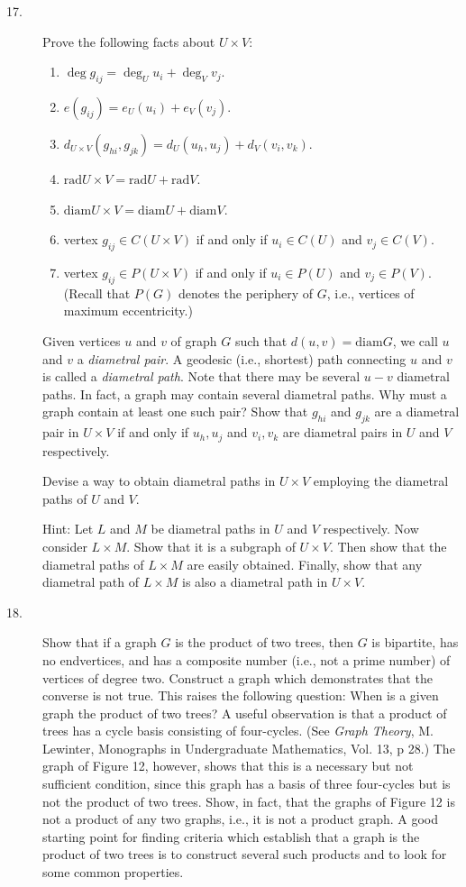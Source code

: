 \documentclass{article}
\begin{document}
\begin{description}
\item[17.] Prove the following facts about $U \times V$:
  \begin{enumerate}[\hspace{1cm}(a)]
    \item $\deg g_{ij} = \deg_U u_i + \deg_V v_j$.
    \item $e(g_{ij}) = e_U(u_i) + e_V(v_j)$.
    \item $d_{U \times V} (g_{hi},g_{jk}) = d_{U} (u_{h},u_{j}) + d_{V} (v_{i},v_{k})$.
    \item $\text{rad} U \times V = \text{rad} U + \text{rad} V$.
    \item $\text{diam} U \times V = \text{diam} U + \text{diam} V$.
    \item vertex $g_{ij} \in C (U \times V)$ if and only if $u_i \in C(U)$ and $v_j \in C(V)$.
    \item vertex $g_{ij} \in P (U \times V)$ if and only if $u_i \in P(U)$ and $v_j \in P(V)$. (Recall that $P(G)$ denotes the periphery of $G$, i.e., vertices of maximum eccentricity.)
  \end{enumerate}
  Given vertices $u$ and $v$ of graph $G$ such that $d(u,v) = \text{diam} G$, we call $u$ and $v$ a \emph{diametral pair}. A geodesic (i.e., shortest) path connecting $u$ and $v$ is called a \emph{diametral path}. Note that there may be several $u - v$ diametral paths. In fact, a graph may contain several diametral paths. Why must a graph contain at least one such pair? Show that $g_{hi}$ and $g_{jk}$ are a diametral pair in $U \times V$ if and only if $u_h,u_j$ and $v_i,v_k$ are diametral pairs in $U$ and $V$ respectively.

  Devise a way to obtain diametral paths in $U \times V$ employing the diametral paths of $U$ and $V$.

  Hint: Let $L$ and $M$ be diametral paths in $U$ and $V$ respectively. Now consider $L \times M$. Show that it is a subgraph of $U \times V$. Then show that the diametral paths of $L \times M$ are easily obtained. Finally, show that any diametral path of $L \times M$ is also a diametral path in $U \times V$.

\item[18.] Show that if a graph $G$ is the product of two trees, then $G$ is bipartite, has no endvertices, and has a composite number (i.e., not a prime number) of vertices of degree two. Construct a graph which demonstrates that the converse is not true. This raises the following question: When is a given graph the product of two trees? A useful observation is that a product of trees has a cycle basis consisting of four-cycles. (See \emph{Graph Theory}, M. Lewinter, Monographs in Undergraduate Mathematics, Vol. 13, p 28.) The graph of Figure 12, however, shows that this is a necessary but not sufficient condition, since this graph has a basis of three four-cycles but is not the product of two trees. Show, in fact, that the graphs of Figure 12 is not a product of any two graphs, i.e., it is not a product graph. A good starting point for finding criteria which establish that a graph is the product of two trees is to construct several such products and to look for some common properties.


\end{description}
\end{document}
